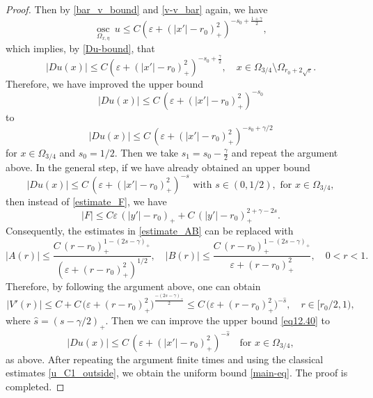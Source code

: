 \documentclass[reqno, 10pt]{amsart}
\theoremstyle{plain}
\theoremstyle{definition}
\theoremstyle{remark}
\newcommand{\osc}{\operatorname{osc}}
\numberwithin{equation}{section}
\begin{document}
\begin{proof}
Then by \eqref{bar_v_bound} and \eqref{v-v_bar} again, we have
$$
\underset{\Omega_{x,\eta}}{\osc}~u\le C (\varepsilon + (|x'|-r_0)_+^2)^{-s_0+\frac{1+\gamma}2}, 
$$
which implies, by \eqref{Du-bound}, that
$$
| Du(x)| \le C (\varepsilon + (|x'|-r_0)_+^2)^{-s_0+\frac{\gamma}2}, \quad x\in \Omega_{3/4}\setminus \Omega_{r_0+2\sqrt{\varepsilon}}.
$$
Therefore, we have improved the upper bound $$
|D u(x)| \le C\,(\varepsilon + (|x'|-r_0)_+^2)^{-s_0}$$ 
to $$
|Du(x)| \le C\,(\varepsilon + (|x'|-r_0)_+^2)^{-s_0+\gamma/2}$$ 
for $x\in \Omega_{3/4}$ and $s_0=1/2$. Then we take $s_1 = s_0 - \frac{\gamma}{2}$ and repeat the argument above. In the general step, if we have already obtained an upper bound
\begin{equation}
    \label{eq12.40}
|D u(x)| \le C\,(\varepsilon + (|x'|-r_0)_+^2)^{-s}\,\, \text{with } s\in(0,1/2), \,\, \text{for } x\in \Omega_{3/4},
\end{equation}
then instead of \eqref{estimate_F}, we have
$$
|F| \le C\varepsilon\,(|y'|-r_0)_+ +C\,(|y'|-r_0)_+^{2+\gamma-2s}.
$$
Consequently, the estimates in \eqref{estimate_AB} can be replaced with
$$
|A(r)| \le \frac{C\,(r-r_0)_+^{1-(2s-\gamma)_+}}{(\varepsilon + (r-r_0)_+^2)^{1/2}}, \quad |B(r)| \le \frac{C\,(r-r_0)_+^{1-(2s-\gamma)_+}}{\varepsilon + (r-r_0)_+^2} , \quad 0 < r < 1.
$$
Therefore, by following the argument above, one can obtain 
$$
|V'(r)| \le C+ C\,\big(\varepsilon + (r-r_0)_+^2\big)^{\frac{-(2s-\gamma)_+}2} \le C\,\big(\varepsilon + (r-r_0)_+^2\big)^{-\hat{s}}, \quad r \in [r_0/2, 1),
$$
where $\hat{s}=(s-\gamma/2)_+$.
Then we can improve the upper bound 
\eqref{eq12.40} to 
$$
|Du(x)| \le C\,(\varepsilon + (|x'|-r_0)_+^2)^{-\hat{s}} \quad \text{for } x\in \Omega_{3/4},
$$ 
as above.
After repeating the argument finite times and using the classical estimates \eqref{u_C1_outside}, we obtain the uniform bound \eqref{main-eq}. The proof is completed.
\end{proof}
\end{document}
